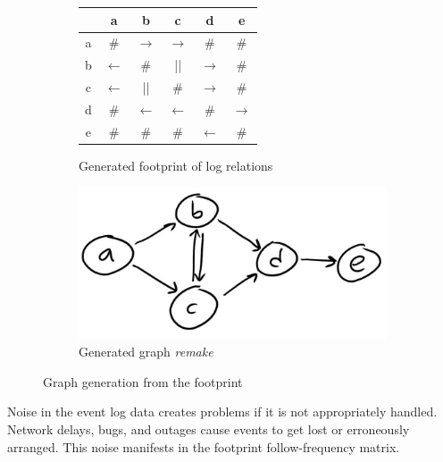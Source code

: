 \documentclass[english,12pt,a4paper,pdftex,sci,utf8]{aaltothesis}
\theoremstyle{definition}
\newcommand{\nyi}[1]{\noindent\colorbox{nyibg}{\textcolor{nyitext}{\emph{#1}}}}
\begin{document}
\begin{figure}
    \centering
    \begin{subfigure}[h]{0.4\linewidth}
        \begin{center}
        \begin{tabular}{cccccc}
        \hline
          & a & b & c & d & e\\
        \hline
        a & \# & $\rightarrow$ & $\rightarrow$ & \# & \# \\
        b & $\leftarrow$ & \# & || & $\rightarrow$ & \# \\
        c & $\leftarrow$ & || & \# & $\rightarrow$ & \# \\
        d & \# & $\leftarrow$ & $\leftarrow$ & \# & $\rightarrow$ \\
        e & \# & \# & \# & $\leftarrow$ & \# \\
        \hline
        \end{tabular}
        \end{center}
        \caption{Generated footprint of log relations}
        \label{tab:examplefootprint}
    \end{subfigure}
    \begin{subfigure}[h]{0.4\linewidth}
        \centering \includegraphics[width=\linewidth]{gfx/graphthing.jpg}
        \caption{Generated graph \nyi{remake}}
        \label{fig:examplegraph}
    \end{subfigure}
    \caption{Graph generation from the footprint}
\end{figure}

Noise in the event log data creates problems if it is not appropriately handled. 
Network delays, bugs, and outages cause events to get lost or erroneously arranged. 
This noise manifests in the footprint follow-frequency matrix.
\end{document}
